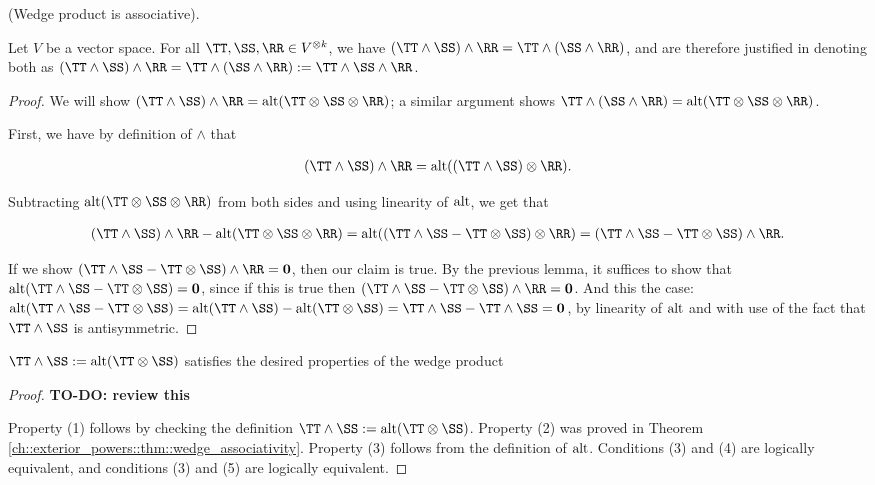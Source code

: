 \begin{theorem}
\label{ch::exterior_powers::thm::wedge_associativity}
    (Wedge product is associative). 
    
    Let $V$ be a vector space. For all $\TT, \SS, \RR \in V^{\otimes k}$, we have $(\TT \wedge \SS) \wedge \RR = \TT \wedge (\SS \wedge \RR)$, and are therefore justified in denoting both as $(\TT \wedge \SS) \wedge \RR = \TT \wedge (\SS \wedge \RR) := \TT \wedge \SS \wedge \RR$.
\end{theorem}

\begin{proof}
    We will show $(\TT \wedge \SS) \wedge \RR = \alt(\TT \otimes \SS \otimes \RR)$; a similar argument shows $\TT \wedge (\SS \wedge \RR) = \alt(\TT \otimes \SS \otimes \RR)$.
    
    First, we have by definition of $\wedge$ that 
    
    \begin{align*}
        (\TT \wedge \SS) \wedge \RR = \alt((\TT \wedge \SS) \otimes \RR).
    \end{align*}
    
    Subtracting $\alt(\TT \otimes \SS \otimes \RR)$ from both sides and using linearity of $\text{alt}$, we get that
    
    \begin{align*}
        (\TT \wedge \SS) \wedge \RR - \alt(\TT \otimes \SS \otimes \RR) = \alt((\TT \wedge \SS - \TT \otimes \SS) \otimes \RR) = (\TT \wedge \SS - \TT \otimes \SS) \wedge \RR.
    \end{align*}
    
    If we show $(\TT \wedge \SS - \TT \otimes \SS) \wedge \RR = \mathbf{0}$, then our claim is true. By the previous lemma, it suffices to show that $\alt(\TT \wedge \SS - \TT \otimes \SS) = \mathbf{0}$, since if this is true then $(\TT \wedge \SS - \TT \otimes \SS) \wedge \RR = \mathbf{0}$. And this the case: $\alt(\TT \wedge \SS - \TT \otimes \SS) = \alt(\TT \wedge \SS) - \alt(\TT \otimes \SS) = \TT \wedge \SS - \TT \wedge \SS = \mathbf{0}$, by linearity of $\text{alt}$ and with use of the fact that $\TT \wedge \SS$ is antisymmetric.
\end{proof}

\begin{theorem}
    $\TT \wedge \SS := \alt(\TT \otimes \SS)$ satisfies the desired properties of the wedge product
\end{theorem}

\begin{proof}
    \textbf{TO-DO: review this}

   Property (1) follows by checking the definition $\TT \wedge \SS := \alt(\TT \otimes \SS)$. Property (2) was proved in Theorem \ref{ch::exterior_powers::thm::wedge_associativity}. Property (3) follows from the definition of $\text{alt}$. Conditions (3) and (4) are logically equivalent, and conditions (3) and (5) are logically equivalent. 
\end{proof}

